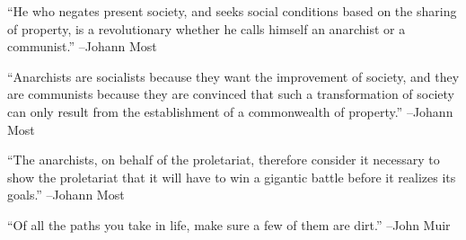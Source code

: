 \documentclass{article}%
\begin{document}
\linebreak%
\vspace{1mm}%
\begin{minipage}{\textwidth}%
\flushleft%
“He who negates present society, and seeks social conditions based on the sharing of property, is a revolutionary whether he calls himself an anarchist or a communist.”%
\linebreak%
\vspace{1mm}%
–Johann Most%
\linebreak%
\vspace{1mm}%
\end{minipage}%
\linebreak%
\vspace{1mm}%
\begin{minipage}{\textwidth}%
\flushleft%
“Anarchists are socialists because they want the improvement of society, and they are communists because they are convinced that such a transformation of society can only result from the establishment of a commonwealth of property.”%
\linebreak%
\vspace{1mm}%
–Johann Most%
\linebreak%
\vspace{1mm}%
\end{minipage}%
\linebreak%
\vspace{1mm}%
\begin{minipage}{\textwidth}%
\flushleft%
“The anarchists, on behalf of the proletariat, therefore consider it necessary to show the proletariat that it will have to win a gigantic battle before it realizes its goals.”%
\linebreak%
\vspace{1mm}%
–Johann Most%
\linebreak%
\vspace{1mm}%
\end{minipage}%
\linebreak%
\vspace{1mm}%
\begin{minipage}{\textwidth}%
\flushleft%
“Of all the paths you take in life, make sure a few of them are dirt.”%
\linebreak%
\vspace{1mm}%
–John Muir%
\linebreak%
\vspace{1mm}%
\end{minipage}%
\linebreak%
\vspace{1mm}%
\end{document}
